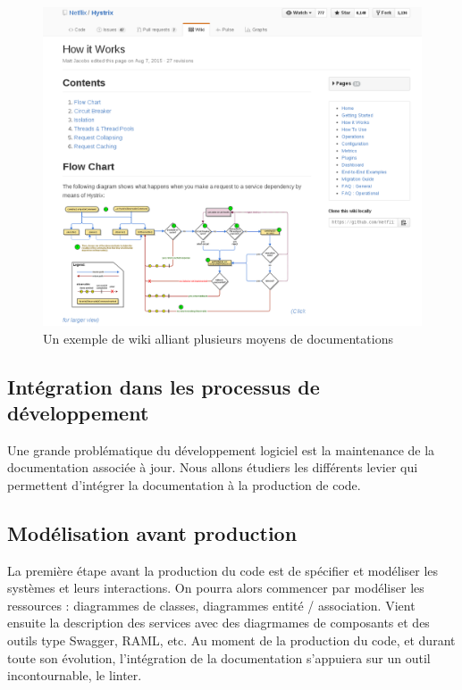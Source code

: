         \begin{figure}[ht]
            \centering
            \includegraphics[width=\textwidth]{./assets/wiki_example.png}
            \caption{Un exemple de wiki alliant plusieurs moyens de documentations}
        \end{figure}

\newpage
\subsection{Intégration dans les processus de développement}
        Une grande problématique du développement logiciel est la maintenance de la documentation associée
        à jour. Nous allons étudiers les différents levier qui permettent d'intégrer la documentation
        à la production de code.

    \subsection{Modélisation avant production}
        La première étape avant la production du code est de spécifier et modéliser les systèmes et leurs
        interactions. On pourra alors commencer par modéliser les ressources : diagrammes de classes,
        diagrammes entité / association. Vient ensuite la description des services avec des diagrmames de composants
        et des outils type Swagger, RAML, etc. Au moment de la production du code, et durant toute son évolution,
        l'intégration de la documentation s'appuiera sur un outil incontournable, le linter.

